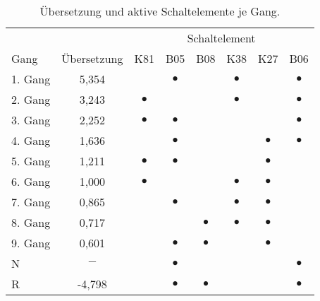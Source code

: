 \begin{table}
	\caption{Übersetzung und aktive Schaltelemente je Gang.}
	\label{tbl:clutches}
	\centering
	\begin{tabular}{l*{7}{c}} 
		\toprule
		& & \multicolumn{6}{c}{Schaltelement} \\
		\cmidrule{3-8}
		Gang & Übersetzung & K81 & B05 & B08 & K38 & K27 & B06 \\
		\midrule 
		1. Gang & 5,354 &           & $\bullet$ &           & $\bullet$ &           & $\bullet$ \\
		2. Gang & 3,243 & $\bullet$ &           &           & $\bullet$ &           & $\bullet$ \\
		3. Gang & 2,252 & $\bullet$ & $\bullet$ &           &           &           & $\bullet$ \\
		4. Gang & 1,636 &           & $\bullet$ &           &           & $\bullet$ & $\bullet$ \\
		5. Gang & 1,211 & $\bullet$ & $\bullet$ &           &           & $\bullet$ &           \\
		6. Gang & 1,000 & $\bullet$ &           &           & $\bullet$ & $\bullet$ &           \\
		7. Gang & 0,865 &           & $\bullet$ &           & $\bullet$ & $\bullet$ &           \\
		8. Gang & 0,717 &           &           & $\bullet$ & $\bullet$ & $\bullet$ &           \\
		9. Gang & 0,601 &           & $\bullet$ & $\bullet$ &           & $\bullet$ &           \\
		N       & $-$   &           & $\bullet$ &           &           &           & $\bullet$ \\
		R       & -4,798&           & $\bullet$ & $\bullet$ &           &           & $\bullet$ \\
		\bottomrule 
	\end{tabular} 
\end{table}

